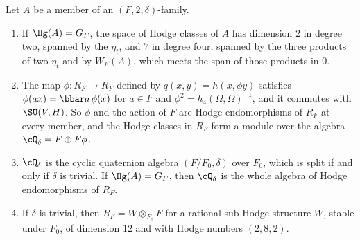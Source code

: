 \begin{proposition}
\label{prop:quarticquat}
Let $A$ be a member of an $(F,2,\delta)$-family.
\begin{enumerate}[label=\textup{(\roman*)},leftmargin=2.6em,itemsep=2pt]
\item If $\Hg(A)=G_{F}$, the space of Hodge classes of $A$ has dimension $2$
  in degree two, spanned by the $\eta_{t}$, and $7$ in degree four, spanned by
  the three products of two $\eta_{t}$ and by $W_{F}(A)$, which meets the span
  of those products in $0$.
\item The map $\phi\colon R_{F}\to R_{F}$ defined by $q(x,y)=h(x,\phi y)$
  satisfies $\phi(ax)=\bbar a\,\phi(x)$ for $a\in F$ and
  $\phi^{2}=h_{4}(\Omega,\Omega)^{-1}$, and it commutes with $\SU(V,H)$. So
  $\phi$ and the action of $F$ are Hodge endomorphisms of $R_{F}$ at every
  member, and the Hodge classes in $R_{F}$ form a module over the algebra
  $\cQ_{\delta}=F\oplus F\phi$.
\item $\cQ_{\delta}$ is the cyclic quaternion algebra $(F/F_{0},\delta)$ over
  $F_{0}$, which is split if and only if $\delta$ is trivial. If
  $\Hg(A)=G_{F}$, then $\cQ_{\delta}$ is the whole algebra of Hodge
  endomorphisms of $R_{F}$.
\item If $\delta$ is trivial, then $R_{F}=W\otimes_{F_{0}}F$ for a rational
  sub-Hodge structure $W$, stable under $F_{0}$, of dimension $12$ and with
  Hodge numbers $(2,8,2)$.
\end{enumerate}
\end{proposition}

